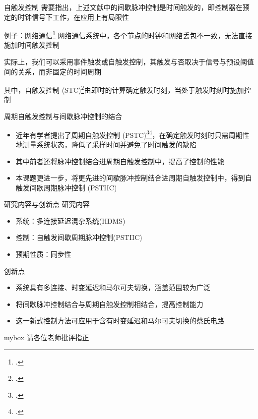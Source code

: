 \documentclass[10pt,aspectratio=43]{beamer}
\begin{document}
\begin{frame}{自触发控制}
需要指出，上述文献中的间歇脉冲控制是\alert{时间触发}的，即控制器在预定的时钟信号下工作，在应用上有局限性
\begin{block}{例子：网络通信\footcite{2003on}}
网络通信系统中，各个节点的时钟和网络丢包不一致，无法直接施加时间触发控制
\end{block}
实际上，我们可以采用事件触发或自触发控制，其触发与否取决于信号与预设阈值间的关系，而非固定的时间周期

其中，\alert{自触发控制} (STC)\footcite{2020self}由即时的计算确定触发时刻，当处于触发时刻时施加控制
\end{frame}

\begin{frame}{周期自触发控制与间歇脉冲控制的结合}
\begin{itemize}
\item 近年有学者提出了\alert{周期自触发控制} (PSTC)\footcite{2021synchronization}\footcite{2019sampling}，在确定触发时刻时只需周期性地测量系统状态，降低了采样时间并避免了时间触发的缺陷
\item 其中前者还将脉冲控制结合进周期自触发控制中，提高了控制的性能
\item 本课题更进一步，将更先进的间歇脉冲控制结合进周期自触发控制中，得到\alert{自触发间歇周期脉冲控制} (PSTIIC)
\end{itemize}

\end{frame}
\begin{frame}{研究内容与创新点}
研究内容
\begin{itemize}
\item 系统：多连接延迟混杂系统(HDMS)
\item 控制：自触发间歇周期脉冲控制(PSTIIC)
\item 预期性质：同步性
\end{itemize}
创新点
\begin{itemize}
\item 系统具有多连接、时变延迟和马尔可夫切换，涵盖范围较为广泛
\item 将间歇脉冲控制结合与周期自触发控制相结合，提高控制能力
\item 这一新式控制方法可应用于含有时变延迟和马尔可夫切换的蔡氏电路
\end{itemize}
\end{frame}

\begin{frame}{}
\begin{center}
\begin{minipage}{1\textwidth}
\begin{beamercolorbox}[wd=0.70\textwidth, rounded=true, shadow=true]{mybox}
\LARGE \centering 请各位老师批评指正
\end{beamercolorbox}
\end{minipage}
\end{center}
\end{frame}
\end{document}
